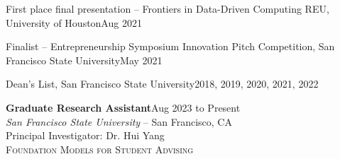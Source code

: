 \documentclass[hidelinks, 10pt]{article}
\begin{document}
{{\vspace{4mm}

\begin{minipage}[ct]{0.9\linewidth}
First place final presentation -- Frontiers in Data-Driven Computing REU,
University of Houston\hfill Aug 2021

\vspace{1.5mm}

Finalist -- Entrepreneurship Symposium Innovation Pitch Competition, San
Francisco State University\hfill May 2021

\vspace{1.5mm}

Dean's List, San Francisco State University\hfill 2018, 2019, 2020, 2021, 2022
\end{minipage}
    
\vspace{4mm}


\hrulefill

\vspace{4mm}

\begin{minipage}[ct]{0.9\linewidth}
\textbf{Graduate Research Assistant}\hfill Aug 2023 to Present\\
\emph{San Francisco State University} -- San Francisco, CA\\
Principal Investigator: Dr. Hui Yang\\
{\textsc{Foundation Models for Student Advising}}
\vspace{1mm}\\
\lipsum[1]
\end{minipage}

}}
\end{document}
